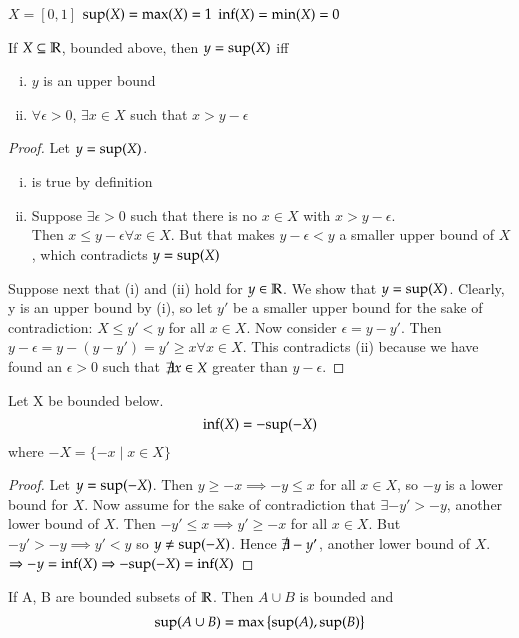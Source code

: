 $X = [0,1]$ \qquad
$\mathrm{sup}(X) = \mathrm{max}(X) = 1$ \qquad
$\mathrm{inf}(X) = \mathrm{min}(X) = 0$

\begin{proposition}
	If $X\subseteq \mathbb{R}$, bounded above, then $y = \mathrm{sup}(X)$ iff
	\begin{enumerate}[(i)]
		\item $y$ is an upper bound
		\item $\forall \epsilon > 0$, $\exists x\in X$ such that $x>y-\epsilon$
	\end{enumerate}
\end{proposition}
\begin{proof}
Let $y = \mathrm{sup}(X)$. \begin{enumerate}[(i)]
\item is true by definition
\item Suppose $\exists \epsilon > 0$ such that there is no $x\in X$ with $x>y-\epsilon$. \\
Then $x\leq y-\epsilon \forall x\in X$. But that makes $y-\epsilon < y$ a smaller upper bound of $X$, which contradicts $y=\mathrm{sup}(X)$
\end{enumerate}

Suppose next that (i) and (ii) hold for $y\in \mathbb{R}$. We show that $y = \mathrm{sup}(X)$. Clearly, y is an upper bound by (i), so let $y'$ be a smaller upper bound for the sake of contradiction: $X\leq y' < y$ for all $x\in X$. Now consider $\epsilon = y-y'$. Then $y-\epsilon = y- (y-y') = y' \geq x \forall x\in X$. This contradicts (ii) because we have found an $\epsilon > 0$ such that $\not \exists x \in X$ greater than $y-\epsilon$.
\end{proof}

\begin{proposition}
	Let X be bounded below.
	\begin{equation}
		\mathrm{inf}(X) = -\mathrm{sup}(-X)
	\end{equation}
	where $-X = \{-x \mid x\in X\}$
\end{proposition}

\begin{proof}
	Let $y = \mathrm{sup} (-X)$. Then $y \geq -x \implies -y \leq x$ for all $x\in X$, so $-y$ is a lower bound for $X$. Now assume for the sake of contradiction that $\exists -y' > -y$, another lower bound of $X$. Then $-y' \leq x \implies y' \geq -x$ for all $x\in X$. But $-y' > -y \implies y' < y$ so $y \neq \mathrm{sup}(-X)$. Hence $\not \exists -y'$, another lower bound of $X$. $\Rightarrow -y = \mathrm{inf}(X) \Rightarrow -\mathrm{sup}(-X) = \mathrm{inf}(X)$
\end{proof}

\begin{proposition}
	If A, B are bounded subsets of $\mathbb{R}$. Then $A\cup B$ is bounded and
	\begin{equation}
		\mathrm{sup}(A\cup B) = \mathrm{max}\left\{ \mathrm{sup}(A), \mathrm{sup}(B) \right\}
	\end{equation}
\end{proposition}
